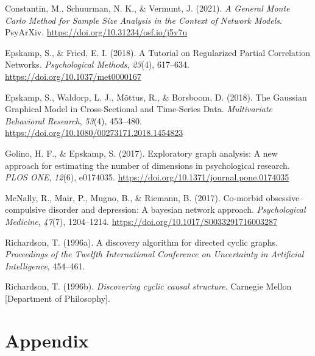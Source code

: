 \documentclass[
]{article}
\newlength{\cslhangindent}
\newlength{\cslentryspacingunit} %
\newenvironment{CSLReferences}[2] %
 {%
  \setlength{\parindent}{0pt}
  \ifodd #1
  \let\oldpar\par
  \def\par{\hangindent=\cslhangindent\oldpar}
  \fi
  \setlength{\parskip}{#2\cslentryspacingunit}
 }%
 {}
\begin{document}
\hypertarget{refs}{}
\begin{CSLReferences}{1}{0}
\leavevmode{}%
Constantin, M., Schuurman, N. K., \& Vermunt, J. (2021). \emph{A {General} {Monte} {Carlo} {Method} for {Sample} {Size} {Analysis} in the {Context} of {Network} {Models}}. PsyArXiv. \url{https://doi.org/10.31234/osf.io/j5v7u}

\leavevmode{}%
Epskamp, S., \& Fried, E. I. (2018). A {Tutorial} on {Regularized} {Partial} {Correlation} {Networks}. \emph{Psychological Methods}, \emph{23}(4), 617--634. \url{https://doi.org/10.1037/met0000167}

\leavevmode{}%
Epskamp, S., Waldorp, L. J., Mõttus, R., \& Borsboom, D. (2018). The {Gaussian} {Graphical} {Model} in {Cross}-{Sectional} and {Time}-{Series} {Data}. \emph{Multivariate Behavioral Research}, \emph{53}(4), 453--480. \url{https://doi.org/10.1080/00273171.2018.1454823}

\leavevmode{}%
Golino, H. F., \& Epskamp, S. (2017). Exploratory graph analysis: {A} new approach for estimating the number of dimensions in psychological research. \emph{PLOS ONE}, \emph{12}(6), e0174035. \url{https://doi.org/10.1371/journal.pone.0174035}

\leavevmode{}%
McNally, R., Mair, P., Mugno, B., \& Riemann, B. (2017). Co-morbid obsessive--compulsive disorder and depression: A bayesian network approach. \emph{Psychological Medicine}, \emph{47}(7), 1204--1214. \url{https://doi.org/10.1017/S0033291716003287}

\leavevmode{}%
Richardson, T. (1996a). A discovery algorithm for directed cyclic graphs. \emph{Proceedings of the Twelfth International Conference on Uncertainty in Artificial Intelligence}, 454--461.

\leavevmode{}%
Richardson, T. (1996b). \emph{Discovering cyclic causal structure}. Carnegie Mellon {[}Department of Philosophy{]}.

\end{CSLReferences}

\newpage

\hypertarget{appendix}{%
\section{Appendix}\label{appendix}}
\end{document}
